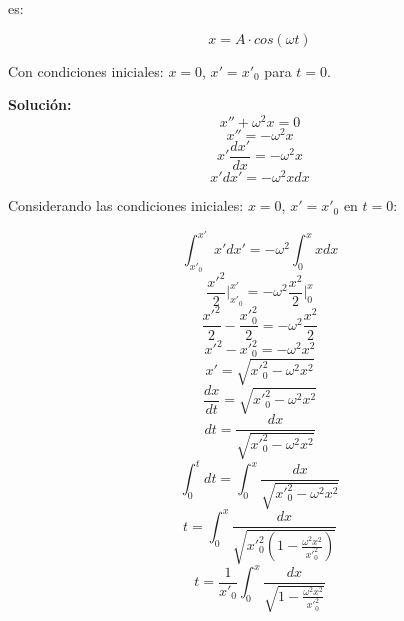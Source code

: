 \documentclass[letter,11pt]{article}
\begin{document}
es:

\begin{equation}
    x = A \cdot cos(\omega t)
\end{equation}

Con condiciones iniciales: $x = 0$, $x' = x'_0$ para $t = 0$.

\vspace{0.5cm}
\textbf{Solución:} \\

\begin{equation*}
    x'' + \omega^2 x = 0
\end{equation*}
\begin{equation*}
    x'' = - \omega^2 x
\end{equation*}
\begin{equation*}
    x' \frac{dx'}{dx} = - \omega^2 x
\end{equation*}
\begin{equation*}
    x' dx' = - \omega^2 x dx
\end{equation*}

Considerando las condiciones iniciales: $x = 0$, $x' = x'_0$ en $t = 0$:

\begin{equation*}
    \int_{x'_0}^{x'} x' dx' = - \omega^2 \int_{0}^{x} x dx
\end{equation*}
\begin{equation*}
    \frac{x'^2}{2} \Biggr|_{x'_0}^{x'} = - \omega^2 \frac{x^2}{2} \Biggr|_{0}^{x}
\end{equation*}
\begin{equation*}
    \frac{x'^2}{2} - \frac{x'^2_0}{2} = - \omega^2 \frac{x^2}{2}
\end{equation*}
\begin{equation*}
    x'^2 - x'^2_0 = - \omega^2 x^2
\end{equation*}
\begin{equation*}
    x' = \sqrt{x'^2_0 - \omega^2 x^2}
\end{equation*}
\begin{equation*}
    \frac{dx}{dt} = \sqrt{x'^2_0 - \omega^2 x^2}
\end{equation*}
\begin{equation*}
    dt = \frac{dx}{\sqrt{x'^2_0 - \omega^2 x^2}}
\end{equation*}
\begin{equation*}
    \int_{0}^{t} dt = \int_{0}^{x} \frac{dx}{\sqrt{x'^2_0 - \omega^2 x^2}}
\end{equation*}
\begin{equation*}
    t = \int_{0}^{x} \frac{dx}{\sqrt{x'^2_0 \left(1 - \frac{\omega^2 x^2}{x'^2_0}\right)}}
\end{equation*}
\begin{equation*}
    t = \frac{1}{x'_0} \int_{0}^{x} \frac{dx}{\sqrt{1 - \frac{\omega^2 x^2}{x'^2_0}}}
\end{equation*}
\end{document}
